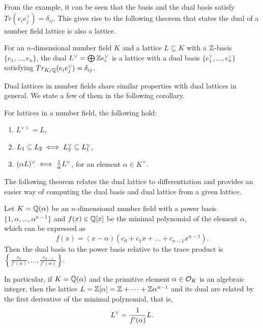 \documentclass[../main.tex]{subfiles}
\begin{document}
From the example, it can be seen that the basis and the dual basis satisfy $Tr(e_i e_j^{\vee}) = \delta_{ij}$. This gives rise to the following theorem that states the dual of a number field lattice is also a lattice. 

\begin{theorem}
\label{app thm:dualBasis}
\reversemarginpar
{}
For an $n$-dimensional number field $K$ and a lattice $L \subseteq K$ with a $\mathbb{Z}$-basis $\{e_1, \dots, e_n\}$, the dual $L^{\vee}=\bigoplus \mathbb{Z} e_i^{\vee}$ is a lattice with a dual basis  $\{e_1^{\vee}, \dots, e_n^{\vee}\}$ satisfying $Tr_{K/\mathbb{Q}}(e_i e_j^{\vee}) = \delta_{ij}$.
\end{theorem}

Dual lattices in number fields share similar properties with dual lattices in general. We state a few of them in the following corollary. 

\begin{corollary}
For lattices in a number field, the following hold: 
\begin{enumerate}
    \item $L^{\vee \vee}=L$,
    \item $L_1 \subseteq L_2 \iff L_2^{\vee} \subseteq L_1^{\vee}$,
    \item $(\alpha L)^{\vee} \iff \frac{1}{\alpha}L^{\vee}$, for an element $\alpha \in K^{\times}$.
\end{enumerate}
\end{corollary}

The following theorem relates the dual lattice to differentiation and provides an easier way of computing the dual basis and dual lattice from a given lattice. 

\begin{theorem}
\label{app thm:dualLatDiff}
\reversemarginpar
{}
Let $K=\mathbb{Q}(\alpha)$ be an $n$-dimensional number field with a power basis $\{1, \alpha, \dots, \alpha^{n-1}\}$ and $f(x) \in \mathbb{Q}[x]$ be the minimal polynomial of the element $\alpha$, which can be expressed as 
\begin{equation*}
    f(x) = (x-\alpha)(c_0 + c_1 x + \dots + c_{n-1} x^{n-1}).
\end{equation*}
Then the dual basis to the power basis relative to the trace product is $\left\{\frac{c_0}{f'(\alpha)}, \dots, \frac{c_{n-1}}{f'(\alpha)}\right\}$.

In particular, if $K=\mathbb{Q}(\alpha)$ and the primitive element $\alpha \in \mathcal{O}_K$ is an algebraic integer, then the lattice $L=\mathbb{Z}[\alpha]=\mathbb{Z} + \dots + \mathbb{Z} \alpha^{n-1}$ and its dual are related by the first derivative of the minimal polynomial, that is, 
\begin{equation*}
    L^{\vee} = \frac{1}{f'(\alpha)}L.
\end{equation*}
\end{theorem}
\end{document}
